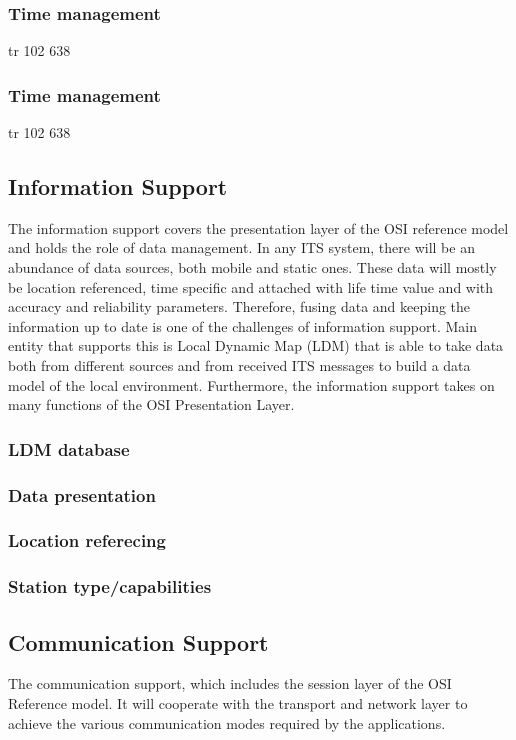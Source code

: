 \subsubsection{Time management}
tr 102 638
\subsubsection{Time management}
tr 102 638
\subsection{Information Support}
The information support covers the presentation layer of the OSI reference model and holds the role of
data management. In any ITS system, there will be an abundance of data sources, both mobile and static
ones. These data will mostly be location referenced, time specific and attached with life time value and
with accuracy and reliability parameters. Therefore, fusing data and keeping the information up to date is
one of the challenges of information support. Main entity that supports this is Local Dynamic
Map (LDM) that is able to take data both from different sources and from received ITS messages to build
a data model of the local environment. Furthermore, the information support takes on many functions of
the OSI Presentation Layer. 
\subsubsection{LDM database}
\subsubsection{Data presentation}
\subsubsection{Location referecing}
\subsubsection{Station type/capabilities}

\subsection{Communication Support}
The communication support, which includes the session layer of the OSI Reference model. It will
cooperate with the transport and network layer to achieve the various communication modes required by
the applications. 

